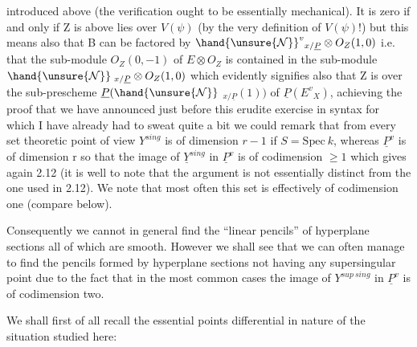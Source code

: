 
introduced above (the verification ought to be essentially
mechanical). It is zero if and only if Z is above lies over $V(\psi)$
(by the very definition of $V(\psi)$!) but this means also that B can
be factored by $\hand{\unsure{\mathcal{N}}}^{v}{}_{x/\underline{P}} \otimes O_{Z}(1,0)$ i.e. that the sub-module $O_{Z}(0,-1)$
of $E \otimes O_{Z}$ is contained in the sub-module $\hand{\unsure{\mathcal{N}}}\;{}_{x/\underline{P}} \otimes O_{Z}(1,0)$ which
evidently signifies also that Z is over the sub-prescheme $\underline{P}(\hand{\unsure{\mathcal{N}}}$
${}_{x/\underline{P}}(1))$ of $\underline{P}(E^{v}{}_{X})$, achieving the proof that we have announced just
before this erudite exercise in syntax for which I have already
had to sweat quite a bit we could remark that from every set
theoretic point of view $Y^{sing}$ is of dimension $r - 1$ if $S = \mathrm{Spec}\ k$,
whereas $\underline{P}^{v}$ is of dimension r so that the image of $\underline{Y}^{sing}$ in $\underline{P}^{v}$ is
of codimension $\geq 1$ which gives again 2.12 (it is well to note that
the argument is not essentially distinct from the one used in
2.12). We note that most often this set is effectively of
codimension one (compare below).

Consequently we cannot in general find the ``linear pencils''
of hyperplane sections all of which are smooth. However we shall
see that we can often manage to find the pencils formed by
hyperplane sections not having any supersingular point due to the
fact that in the most common cases the image of $Y^{sup\ sing}$ in $\underline{P}^{v}$ is
of codimension two.

We shall first of all recall the essential points
differential in nature of the situation studied here:
